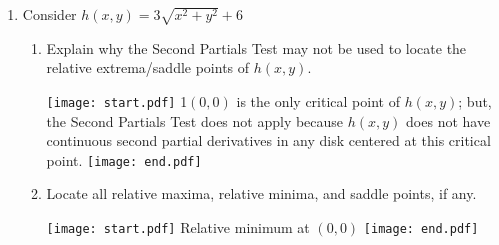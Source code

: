 \documentclass[12pt]{article}
\begin{document}
\begin{enumerate}
\item Consider $h(x,y)=3\sqrt{x^2+y^2}+6$

\begin{enumerate}

\item Explain why the Second Partials Test may not be used to locate the relative extrema/saddle points of $h(x,y)$.  

\texttt{[image: start.pdf]}
{{{1\linewidth}{$(0,0)$ is the only critical point of $h(x,y)$; but, the Second Partials Test does not apply because $h(x,y)$ does not have continuous second partial derivatives in any disk centered at this critical point.}}}
\texttt{[image: end.pdf]}


\item Locate all relative maxima, relative minima, and saddle points, if any.

\texttt{[image: start.pdf]}
{{Relative minimum at $(0,0)$}}
\texttt{[image: end.pdf]}


\end{enumerate}

\end{enumerate}

\end{document}
